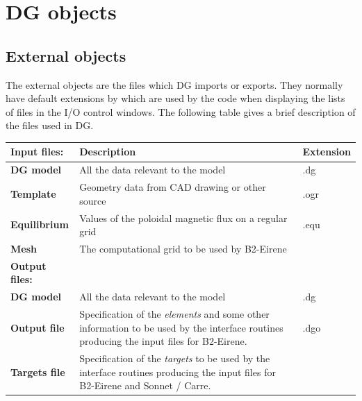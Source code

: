 \documentclass[12pt]{report}
\begin{document}
\section{DG objects}

\subsection{External objects}

The external objects are the files which DG imports or exports. They
normally have default extensions by which are used by the code when
displaying the lists of files in the I/O control windows. The following
table gives a brief description of the files used in DG.


{\raggedright
\renewcommand{\arraystretch}{1.5}
\vspace{3pt} \noindent
\begin{tabular}{|p{113pt}p{200pt}p{59pt}|}
\hline
\parbox{113pt}{\raggedright 
\textbf{Input files:}
} & {\centering 
\textbf{Description}
} & \parbox{59pt}{\centering 
\textbf{Extension}
} \\
\hline
\parbox{113pt}{\centering 
\textbf{DG model}
} & 
All the data relevant to the model
& \parbox{59pt}{\centering 
.dg
} \\
\parbox{113pt}{\centering 
\textbf{Template}
} & 
Geometry data from CAD drawing or other source
& \parbox{59pt}{\centering 
.ogr
} \\
\parbox{113pt}{\centering 
\textbf{Equilibrium}
} & 
Values of the poloidal magnetic flux on a regular grid
& \parbox{59pt}{\centering 
.equ
} \\
\parbox{113pt}{\centering 
\textbf{Mesh}
} & 
The computational grid to be used by B2-Eirene
& \parbox{59pt}{\raggedright 
~
} \\
\hline
\parbox{113pt}{\raggedright 
\textbf{Output files:}
} & 
~
& \parbox{59pt}{\raggedright 
~
} \\
\hline
\parbox{113pt}{\centering 
\textbf{DG model}
} & 
All the data relevant to the model
& \parbox{59pt}{\centering 
.dg
} \\
\parbox{113pt}{\centering 
\textbf{Output file}
} &
Specification of the \textit{elements} and some other information
\textendash{} to be used by the interface routines producing the input
files for B2-Eirene.
& \parbox{59pt}{\centering 
.dgo
} \\
\parbox{113pt}{\centering 
\textbf{Targets file}
} &
Specification of the \textit{targets} \textendash{} to be used by the
interface routines producing the input files for B2-Eirene and Sonnet / Carre.

\end{tabular}}
\end{document}
